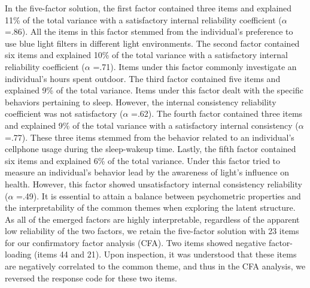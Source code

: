 \documentclass[
  english,
  man]{apa6}
\begin{document}
In the five-factor solution, the first factor contained three items and explained 11\% of the total variance with a satisfactory internal reliability coefficient (\(\alpha\) =.86). All the items in this factor stemmed from the individual's preference to use blue light filters in different light environments. The second factor contained six items and explained 10\% of the total variance with a satisfactory internal reliability coefficient (\(\alpha\) =.71). Items under this factor commonly investigate an individual's hours spent outdoor. The third factor contained five items and explained 9\% of the total variance. Items under this factor dealt with the specific behaviors pertaining to sleep. However, the internal consistency reliability coefficient was not satisfactory (\(\alpha\) =.62). The fourth factor contained three items and explained 9\% of the total variance with a satisfactory internal consistency (\(\alpha\) =.77). These three items stemmed from the behavior related to an individual's cellphone usage during the sleep-wakeup time. Lastly, the fifth factor contained six items and explained 6\% of the total variance. Under this factor tried to measure an individual's behavior lead by the awareness of light's influence on health. However, this factor showed unsatisfactory internal consistency reliability (\(\alpha\) =.49). It is essential to attain a balance between psychometric properties and the interpretability of the common themes when exploring the latent structure. As all of the emerged factors are highly interpretable, regardless of the apparent low reliability of the two factors, we retain the five-factor solution with 23 items for our confirmatory factor analysis (CFA). Two items showed negative factor-loading (items 44 and 21). Upon inspection, it was understood that these items are negatively correlated to the common theme, and thus in the CFA analysis, we reversed the response code for these two items.
\end{document}
